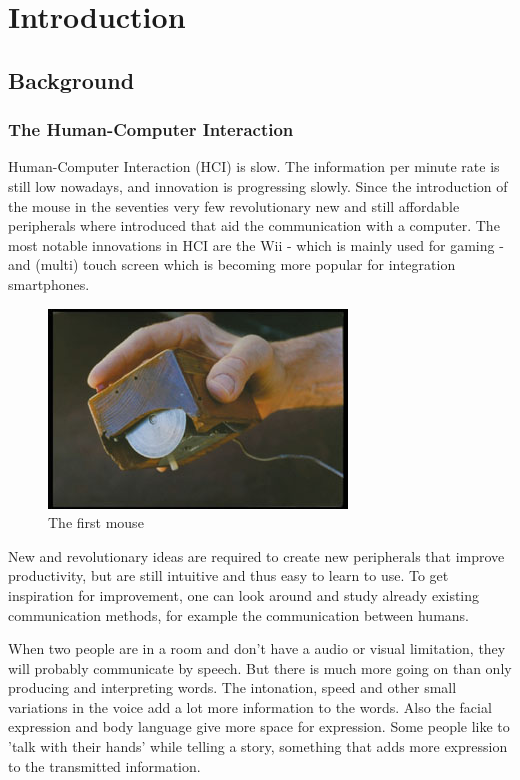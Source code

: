 
\chapter{Introduction}
\label{ch:intro}

\section{Background}
\subsection*{The Human-Computer Interaction}
Human-Computer Interaction (HCI) is slow. The information per minute rate is still low nowadays, and innovation is progressing slowly. Since the introduction of the mouse in the seventies very few revolutionary new and still affordable peripherals where introduced that aid the communication with a computer. The most notable innovations in HCI are the Wii - which is mainly used for gaming - and (multi) touch screen which is becoming more popular for integration smartphones.

\begin{figure}[htbp]
	\center{}
	\label{fig:mouse}
	\includegraphics[width=0.3\linewidth]{figures/mouse.jpg}
	\caption{The first mouse}
\end{figure}

New and revolutionary ideas are required to create new peripherals that improve productivity, but are still intuitive and thus easy to learn to use. To get inspiration for improvement, one can look around and study already existing communication methods, for example the communication between humans. 

When two people are in a room and don't have a audio or visual limitation, they will probably communicate by speech. But there is much more going on than only producing and interpreting words. The intonation, speed and other small variations in the voice add a lot more information to the words. Also the facial expression and body language give more space for expression. Some people like to 'talk with their hands' while telling a story, something that adds more expression to the transmitted information.

